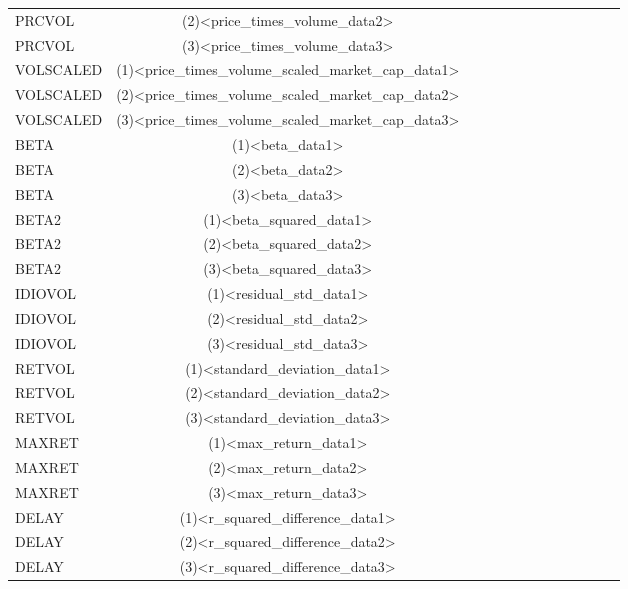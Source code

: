 \documentclass{article}
\begin{document}
{\begin{tiny}
\begin{tabular}{lcccccccccccr}
                \\
                PRCVOL & (2)<price_times_volume_data2>
                \\
                PRCVOL & (3)<price_times_volume_data3>
                \\
                VOLSCALED & (1)<price_times_volume_scaled_market_cap_data1>
                \\
                VOLSCALED & (2)<price_times_volume_scaled_market_cap_data2>
                \\
                VOLSCALED & (3)<price_times_volume_scaled_market_cap_data3>
                \\
                BETA & (1)<beta_data1>
                \\
                BETA & (2)<beta_data2>
                \\
                BETA & (3)<beta_data3>
                \\
                BETA2 & (1)<beta_squared_data1>
                \\
                BETA2 & (2)<beta_squared_data2>
                \\
                BETA2 & (3)<beta_squared_data3>
                \\
                IDIOVOL & (1)<residual_std_data1>
                \\
                IDIOVOL & (2)<residual_std_data2>
                \\
                IDIOVOL & (3)<residual_std_data3>
                \\
                RETVOL & (1)<standard_deviation_data1>
                \\
                RETVOL & (2)<standard_deviation_data2>
                \\
                RETVOL & (3)<standard_deviation_data3>
                \\
                MAXRET & (1)<max_return_data1>
                \\
                MAXRET & (2)<max_return_data2>
                \\
                MAXRET & (3)<max_return_data3>
                \\
                DELAY & (1)<r_squared_difference_data1>
                \\
                DELAY & (2)<r_squared_difference_data2>
                \\
                DELAY & (3)<r_squared_difference_data3>
                \\

\end{tabular}
\end{tiny}}
\end{document}
